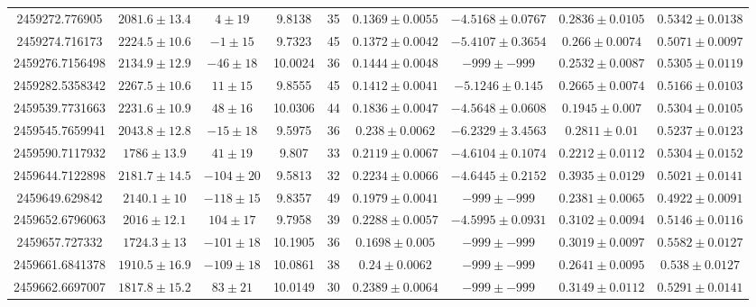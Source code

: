 \documentclass[twocolumn,twocolappendix]{aastex631}
\begin{document}
\begin{table}
\begin{rotatetable*}
\begin{center}
{\begin{tabular}{ccccccccc}
2459272.776905  & $2081.6 \pm 13.4$ & $4 \pm 19   $ & 9.8138  & 35     & $0.1369 \pm 0.0055 $& $-4.5168 \pm 0.0767 $&$ 0.2836 \pm 0.0105 $&$ 0.5342 \pm 0.0138 $\\
2459274.716173  & $2224.5 \pm 10.6$ & $-1 \pm 15  $ & 9.7323  & 45     & $0.1372 \pm 0.0042 $& $-5.4107 \pm 0.3654 $&$ 0.266 \pm 0.0074  $&$ 0.5071 \pm 0.0097 $\\
2459276.7156498 & $2134.9 \pm 12.9$ & $-46 \pm 18 $ & 10.0024 & 36     & $0.1444 \pm 0.0048 $& $-999 \pm -999      $&$ 0.2532 \pm 0.0087 $&$ 0.5305 \pm 0.0119 $\\
2459282.5358342 & $2267.5 \pm 10.6$ & $11 \pm 15  $ & 9.8555  & 45     & $0.1412 \pm 0.0041 $& $-5.1246 \pm 0.145  $&$ 0.2665 \pm 0.0074 $&$ 0.5166 \pm 0.0103 $\\
2459539.7731663 & $2231.6 \pm 10.9$ & $48 \pm 16  $ & 10.0306 & 44     & $0.1836 \pm 0.0047 $& $-4.5648 \pm 0.0608 $&$ 0.1945 \pm 0.007  $&$ 0.5304 \pm 0.0105 $\\
2459545.7659941 & $2043.8 \pm 12.8$ & $-15 \pm 18 $ & 9.5975  & 36     & $0.238 \pm 0.0062  $& $-6.2329 \pm 3.4563 $&$ 0.2811 \pm 0.01   $&$ 0.5237 \pm 0.0123 $\\
2459590.7117932 & $1786 \pm 13.9$   & $41 \pm 19  $ & 9.807   & 33     & $0.2119 \pm 0.0067 $& $-4.6104 \pm 0.1074 $&$ 0.2212 \pm 0.0112 $&$ 0.5304 \pm 0.0152 $\\
2459644.7122898 & $2181.7 \pm 14.5$ & $-104 \pm 20$ & 9.5813  & 32     & $0.2234 \pm 0.0066 $& $-4.6445 \pm 0.2152 $&$ 0.3935 \pm 0.0129 $&$ 0.5021 \pm 0.0141 $\\
2459649.629842  & $2140.1 \pm 10$   & $-118 \pm 15 $& 9.8357  & 49     & $0.1979 \pm 0.0041 $& $-999 \pm -999      $&$ 0.2381 \pm 0.0065 $&$ 0.4922 \pm 0.0091 $\\
2459652.6796063 & $2016 \pm 12.1$   & $104 \pm 17  $& 9.7958  & 39     & $0.2288 \pm 0.0057 $& $-4.5995 \pm 0.0931 $&$ 0.3102 \pm 0.0094 $&$ 0.5146 \pm 0.0116 $\\
2459657.727332  & $1724.3 \pm 13$   & $-101 \pm 18$ & 10.1905 & 36     & $0.1698 \pm 0.005  $& $-999 \pm -999     $ &$ 0.3019 \pm 0.0097 $&$ 0.5582 \pm 0.0127 $\\
2459661.6841378 & $1910.5 \pm 16.9$ & $-109 \pm 18$& 10.0861 & 38     & $0.24 \pm 0.0062   $& $-999 \pm -999      $& $0.2641 \pm 0.0095 $& $0.538 \pm 0.0127  $\\
2459662.6697007 & $1817.8 \pm 15.2$ & $83 \pm 21  $ & 10.0149 & 30     & $0.2389 \pm 0.0064 $& $-999 \pm -999      $&$ 0.3149 \pm 0.0112 $&$ 0.5291 \pm 0.0141 $\\

\end{tabular}}
\end{center}
\end{rotatetable*}
\end{table}
\end{document}
